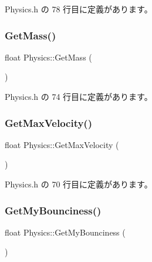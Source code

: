 Physics.\+h の 78 行目に定義があります。

\mbox{\label{class_physics_a80a377efcd573cff3484d91c9f5512e4}} 
\subsubsection{\texorpdfstring{Get\+Mass()}{GetMass()}}
{\footnotesize\ttfamily float Physics\+::\+Get\+Mass (\begin{DoxyParamCaption}{ }\end{DoxyParamCaption})\hspace{0.3cm}{\ttfamily [inline]}}



 Physics.\+h の 74 行目に定義があります。

\mbox{\label{class_physics_a0ee3b82e3e1588fee1727e582c824467}} 
\subsubsection{\texorpdfstring{Get\+Max\+Velocity()}{GetMaxVelocity()}}
{\footnotesize\ttfamily float Physics\+::\+Get\+Max\+Velocity (\begin{DoxyParamCaption}{ }\end{DoxyParamCaption})\hspace{0.3cm}{\ttfamily [inline]}}



 Physics.\+h の 70 行目に定義があります。

\mbox{\label{class_physics_acd6312afafb3faed57ba6450ed9ab9a6}} 
\subsubsection{\texorpdfstring{Get\+My\+Bounciness()}{GetMyBounciness()}}
{\footnotesize\ttfamily float Physics\+::\+Get\+My\+Bounciness (\begin{DoxyParamCaption}{ }\end{DoxyParamCaption})\hspace{0.3cm}{\ttfamily [inline]}}



